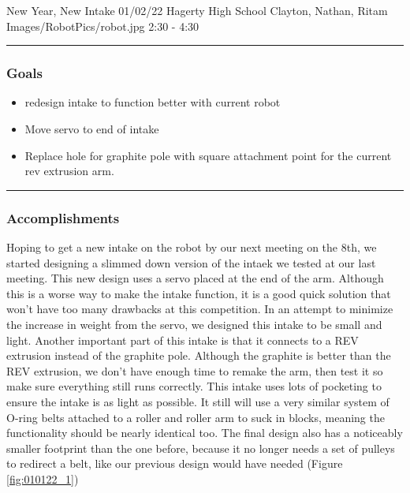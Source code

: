 \insertmeeting 
  {New Year, New Intake} 
  {01/02/22} 
  {Hagerty High School}
  {Clayton, Nathan, Ritam}
  {Images/RobotPics/robot.jpg}
  {2:30 - 4:30}
  
\noindent\hfil\rule{\textwidth}{.4pt}\hfil
\subsubsection*{Goals}
\begin{itemize}
    \item redesign intake to function better with current robot
    \item Move servo to end of intake
    \item Replace hole for graphite pole with square attachment point for the current rev extrusion arm.

 

\end{itemize} 

\noindent\hfil\rule{\textwidth}{.4pt}\hfil

\subsubsection*{Accomplishments}
Hoping to get a new intake on the robot by our next meeting on the 8th, we started designing a slimmed down version of the intaek we tested at our last meeting. This new design uses a servo placed at the end of the arm. Although this is a worse way to make the intake function, it is a good quick solution that won’t have too many drawbacks at this competition. In an attempt to minimize the increase in weight from the servo, we designed this intake to be small and light. Another important part of this intake is that it connects to a REV extrusion instead of the graphite pole. Although the graphite is better than the REV extrusion, we don’t have enough time to remake the arm, then test it so make sure everything still runs correctly. This intake uses lots of pocketing to ensure the intake is as light as possible. It still will use a very similar system of O-ring belts attached to a roller and roller arm to suck in blocks, meaning the functionality should be nearly identical too. The final design also has a noticeably smaller footprint than the one before, because it no longer needs a set of pulleys to redirect a belt, like our previous design would have needed (Figure \ref{fig:010122_1})

